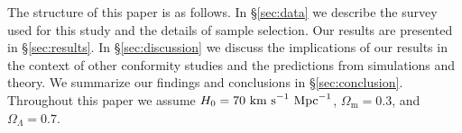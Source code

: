 The structure of this paper is as follows.
In \S\ref{sec:data} we describe the survey used for this study and the details of sample selection.
Our results are presented in \S\ref{sec:results}.
In \S\ref{sec:discussion} we discuss the implications of our results in the context of other conformity studies and the predictions from simulations and theory.
We summarize our findings and conclusions in \S\ref{sec:conclusion}.
Throughout this paper we assume $H_{0}=70~\textrm{km~s}^{-1}~\textrm{Mpc}^{-1}$, $\Omega_{\textrm{m}}=0.3$, and $\Omega_{\Lambda}=0.7$.



